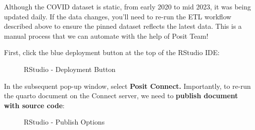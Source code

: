 \documentclass[
  letterpaper,
  DIV=11,
  numbers=noendperiod]{scrreprt}
\begin{document}
Although the COVID dataset is static, from early 2020 to mid 2023, it
was being updated daily. If the data changes, you'll need to re-run the
ETL workflow described above to ensure the pinned dataset reflects the
latest data. This is a manual process that we can automate with the help
of Posit Team!

First, click the blue deployment button at the top of the RStudio IDE:

\begin{figure}


\caption{\label{fig-deployment-button}RStudio - Deployment Button}

\end{figure}%

In the subsequent pop-up window, select \textbf{Posit Connect.}
Importantly, to re-run the quarto document on the Connect server, we
need to \textbf{publish document with source code}:

\begin{figure}


\caption{\label{fig-with-source-code}RStudio - Publish Options}

\end{figure}%
\end{document}
